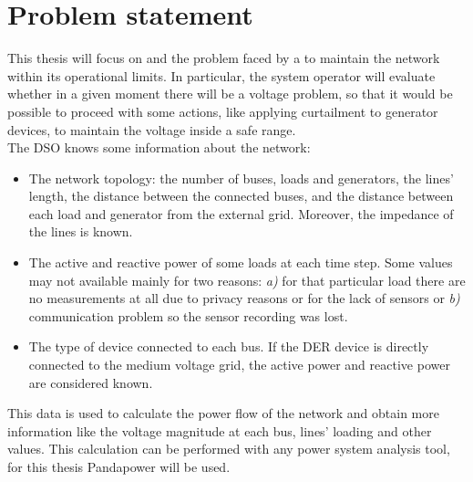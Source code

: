 \section{Problem statement}
\label{sec:ps}
This thesis will focus on  and the problem faced by a  to maintain the network within its operational limits. In particular, the system operator will evaluate whether in a given moment there will be a voltage problem, so that it would be possible to proceed with some actions, like applying curtailment to generator devices, to maintain the voltage inside a safe range.\\

The \gls{DSO} knows some information about the network:
\begin{itemize}
    \item The network topology: the number of buses, loads and generators, the lines' length, the distance between the connected buses, and the distance between each load and generator from the external grid. Moreover, the impedance of the lines is known.
    
    \item The active and reactive power of some loads at each time step. Some values may not available mainly for two reasons: \emph{a)} for that particular load there are no measurements at all due to privacy reasons or for the lack of sensors or \emph{b)} communication problem so the sensor recording was lost.
    
    \item The type of  device connected to each bus. If the \gls{DER} device is directly connected to the medium voltage grid, the active power and reactive power are considered known. 
\end{itemize}

This data is used to calculate the power flow of the network and obtain more information like the voltage magnitude at each bus, lines' loading and other values. This calculation can be performed with any power system analysis tool, for this thesis Pandapower will be used.\\


